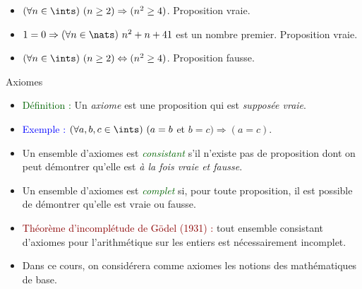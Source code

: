 \begin{frame}
\begin{itemize}
\item $(\forall n \in \ints)~(n \geq 2) \Rightarrow (n^2 \geq 4)$.
Proposition vraie.
\item $1 = 0 \Rightarrow (\forall n \in \nats)~n^2 + n + 41$ est un
nombre premier.  Proposition vraie.
\item $(\forall n \in \ints)~(n \geq 2) \Leftrightarrow (n^2 \geq 4)$.
Proposition fausse.
\end{itemize}
\end{frame}

\begin{frame}{Axiomes}

\begin{itemize}
\item
\textcolor{darkgreen}{Définition :} 
Un {\em axiome} est une proposition qui est {\em supposée vraie}.
\item
\textcolor{blue}{Exemple :} 
$(\forall a,b,c \in \ints)~(a = b$ et $b = c) \Rightarrow (a = c)$.
\item
Un ensemble d'axiomes est \textcolor{darkgreen}{\em consistant} 
s'il n'existe pas de proposition
dont on peut démontrer qu'elle est {\em à la fois vraie et fausse}.
\item
Un ensemble d'axiomes est \textcolor{darkgreen}{\em complet} 
si, pour toute proposition, il
est possible de démontrer qu'elle est vraie ou fausse.
\item
\textcolor{darkred}{Théorème d'incomplétude de Gödel (1931) :} 
tout ensemble consistant 
d'axiomes pour l'arithmétique sur les entiers est nécessairement
incomplet.
\item
Dans ce cours, on considérera comme axiomes les notions des mathématiques
de base.
\end{itemize}

\end{frame}

